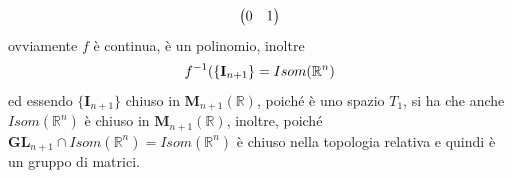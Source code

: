 \documentclass[oneside, 11pt]{amsbook}
\makeatletter
\newcommand{\0}{{(0)}}
\newcommand{\3}{{(3)}}
\theoremstyle{colonplain}
\theoremstyle{colondefinition}
\theoremstyle{colonremark}
\numberwithin{equation}{chapter}
\renewcommand{\proofname}{Dimostrazione}
\renewenvironment{proof}[1][\proofname]{\par
  \pushQED{\qed}%
  \normalfont \topsep6\p@\@plus6\p@\relax
  \trivlist
  \item[\hskip\labelsep\bfseries #1:]\ignorespaces
}{%
  \popQED\endtrivlist\@endpefalse
}
\makeatother
\begin{document}
\begin{proof}
\begin{align}
\begin{pmatrix}
        0 & 1
    \end{pmatrix} \notag
\end{align}
ovviamente $f$ è continua, è un polinomio, inoltre
\begin{align}
    f^{-1}(\{ \mathbf{I}_{n + 1} \} = Isom(\mathbb{R}^n) \notag
\end{align}
ed essendo $\{ \mathbf{I}_{n + 1} \}$ chiuso in $\mathbf{M}_{n + 1}(\mathbb{R})$, poiché è uno spazio $T_1$, si ha che anche $Isom(\mathbb{R}^n)$ è chiuso in $\mathbf{M}_{n + 1}(\mathbb{R})$, inoltre, poiché $\mathbf{GL}_{n + 1} \cap Isom(\mathbb{R}^n) = Isom(\mathbb{R}^n)$ è chiuso nella topologia relativa e quindi è un gruppo di matrici.



\end{proof}
\end{document}
